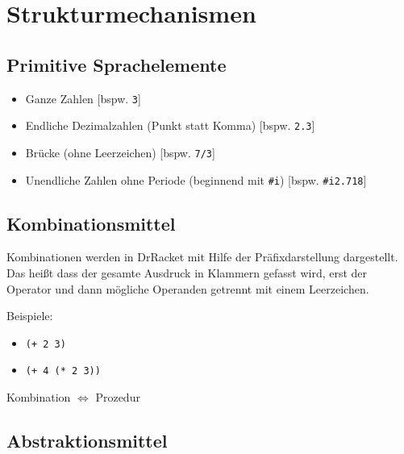 \documentclass[12pt]{scrreprt}
\begin{document}
        \section{Strukturmechanismen}
            \label{s:drracket_struktur}

            \subsection{Primitive Sprachelemente}
                \label{ss:drracket_struktur_primitive}

                \begin{itemize}
                    \item Ganze Zahlen [bspw. \texttt{3}]
                    \item Endliche Dezimalzahlen (Punkt statt Komma) [bspw. \texttt{2.3}]
                    \item Brücke (ohne Leerzeichen) [bspw. \texttt{7/3}]
                    \item Unendliche Zahlen ohne Periode (beginnend mit \texttt{\#i}) [bspw. \texttt{\#i2.718}]
                \end{itemize}


            \subsection{Kombinationsmittel}
                \label{ss:drracket_struktur_kombination}

                Kombinationen werden in DrRacket mit Hilfe der Präfixdarstellung dargestellt. Das heißt dass der gesamte Ausdruck in Klammern gefasst wird, erst der Operator und dann mögliche Operanden getrennt mit einem Leerzeichen.

                Beispiele:
                \begin{itemize}
                    \item \texttt{(+ 2 3)}
                    \item \texttt{(+ 4 (* 2 3))}
                \end{itemize}

                Kombination $ \iff $ Prozedur


            \subsection{Abstraktionsmittel}
                \label{ss:drracket_struktur_abstraktion}
\end{document}
